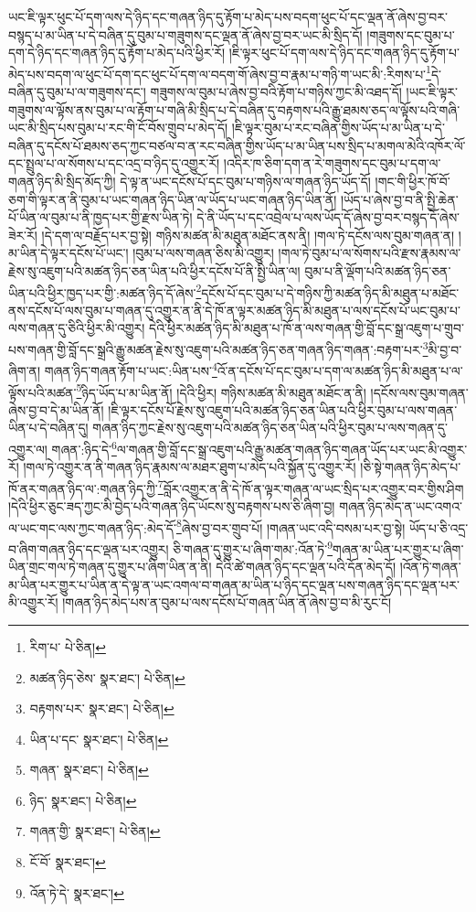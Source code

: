 ཡང་ཇི་ལྟར་ཕུང་པོ་དག་ལས་དེ་ཉིད་དང་གཞན་ཉིད་དུ་རྟོག་པ་མེད་པས་བདག་ཕུང་པོ་དང་ལྡན་ནོ་ཞེས་བྱ་བར་བསྙད་པ་མ་ཡིན་པ་དེ་བཞིན་དུ་བུམ་པ་གཟུགས་དང་ལྡན་ནོ་ཞེས་བྱ་བར་ཡང་མི་སྲིད་དོ། །གཟུགས་དང་བུམ་པ་དག་དེ་ཉིད་དང་གཞན་ཉིད་དུ་རྟོག་པ་མེད་པའི་ཕྱིར་རོ། །ཇི་ལྟར་ཕུང་པོ་དག་ལས་དེ་ཉིད་དང་གཞན་ཉིད་དུ་རྟོག་པ་མེད་པས་བདག་ལ་ཕུང་པོ་དག་དང་ཕུང་པོ་དག་ལ་བདག་གོ་ཞེས་བྱ་བ་རྣམ་པ་གཉི་ག་ཡང་མི་:རིགས་པ་\footnote{རིག་པ་  པེ་ཅིན། }དེ་བཞིན་དུ་བུམ་པ་ལ་གཟུགས་དང་། གཟུགས་ལ་བུམ་པ་ཞེས་བྱ་བའི་རྟོག་པ་གཉིས་ཀྱང་མི་འཐད་དོ། །ཡང་ཇི་ལྟར་གཟུགས་ལ་ལྟོས་ནས་བུམ་པ་ལ་རྟོག་པ་གཞི་མི་སྲིད་པ་དེ་བཞིན་དུ་བརྟགས་པའི་རྒྱུ་ཐམས་ཅད་ལ་ལྟོས་པའི་གཞི་ཡང་མི་སྲིད་པས་བུམ་པ་རང་གི་ངོ་བོས་གྲུབ་པ་མེད་དོ། །ཇི་ལྟར་བུམ་པ་རང་བཞིན་གྱིས་ཡོད་པ་མ་ཡིན་པ་དེ་བཞིན་དུ་དངོས་པོ་ཐམས་ཅད་ཀྱང་བཙལ་བ་ན་རང་བཞིན་གྱིས་ཡོད་པ་མ་ཡིན་པས་སྲིད་པ་མགལ་མེའི་འཁོར་ལོ་དང་སྤྲུལ་པ་ལ་སོགས་པ་དང་འདྲ་བ་ཉིད་དུ་འགྱུར་རོ། །འདིར་ཁ་ཅིག་དག་ན་རེ་གཟུགས་དང་བུམ་པ་དག་ལ་གཞན་ཉིད་མི་སྲིད་མོད་ཀྱི། དེ་ལྟ་ན་ཡང་དངོས་པོ་དང་བུམ་པ་གཉིས་ལ་གཞན་ཉིད་ཡོད་དོ། །གང་གི་ཕྱིར་ཁོ་བོ་ཅག་གི་ལྟར་ན་ནི་བུམ་པ་ཡང་གཞན་ཉིད་ཡིན་ལ་ཡོད་པ་ཡང་གཞན་ཉིད་ཡིན་ནོ། །ཡོད་པ་ཞེས་བྱ་བ་ནི་སྤྱི་ཆེན་པོ་ཡིན་ལ་བུམ་པ་ནི་ཁྱད་པར་གྱི་རྫས་ཡིན་ཏེ། དེ་ནི་ཡོད་པ་དང་འབྲེལ་པ་ལས་ཡོད་དོ་ཞེས་བྱ་བར་བསྙད་དོ་ཞེས་ཟེར་རོ། །དེ་དག་ལ་བརྗོད་པར་བྱ་སྟེ། གཉིས་མཚན་མི་མཐུན་མཐོང་ནས་ནི། །གལ་ཏེ་དངོས་ལས་བུམ་གཞན་ན། །མ་ཡིན་དེ་ལྟར་དངོས་པོ་ཡང་། །བུམ་པ་ལས་གཞན་ཅིས་མི་འགྱུར། །གལ་ཏེ་བུམ་པ་ལ་སོགས་པའི་རྫས་རྣམས་ལ་རྗེས་སུ་འཇུག་པའི་མཚན་ཉིད་ཅན་ཡིན་པའི་ཕྱིར་དངོས་པོ་ནི་སྤྱི་ཡིན་ལ། བུམ་པ་ནི་ལྡོག་པའི་མཚན་ཉིད་ཅན་ཡིན་པའི་ཕྱིར་ཁྱད་པར་གྱི་:མཚན་ཉིད་དོ་ཞེས་\footnote{མཚན་ཉིད་ཅེས་  སྣར་ཐང་།  པེ་ཅིན། }དངོས་པོ་དང་བུམ་པ་དེ་གཉིས་ཀྱི་མཚན་ཉིད་མི་མཐུན་པ་མཐོང་ནས་དངོས་པོ་ལས་བུམ་པ་གཞན་དུ་འགྱུར་ན་ནི་དེ་ཁོ་ན་ལྟར་མཚན་ཉིད་མི་མཐུན་པ་ལས་དངོས་པོ་ཡང་བུམ་པ་ལས་གཞན་དུ་ཅིའི་ཕྱིར་མི་འགྱུར། དེའི་ཕྱིར་མཚན་ཉིད་མི་མཐུན་པ་ཁོ་ན་ལས་གཞན་གྱི་བློ་དང་སྒྲ་འཇུག་པ་གྲུབ་པས་གཞན་གྱི་བློ་དང་སྒྲའི་རྒྱུ་མཚན་རྗེས་སུ་འཇུག་པའི་མཚན་ཉིད་ཅན་གཞན་ཉིད་གཞན་:བརྟག་པར་\footnote{བརྟགས་པར་  སྣར་ཐང་།  པེ་ཅིན། }མི་བྱ་བ་ཞིག་ན། གཞན་ཉིད་གཞན་རྟོག་པ་ཡང་:ཡིན་པས་\footnote{ཡིན་པ་དང་  སྣར་ཐང་།  པེ་ཅིན། }འོ་ན་དངོས་པོ་དང་བུམ་པ་དག་ལ་མཚན་ཉིད་མི་མཐུན་པ་ལ་ལྟོས་པའི་མཚན་\footnote{གཞན་  སྣར་ཐང་།  པེ་ཅིན། }ཉིད་ཡོད་པ་མ་ཡིན་ནོ། །དེའི་ཕྱིར། གཉིས་མཚན་མི་མཐུན་མཐོང་ན་ནི། །དངོས་ལས་བུམ་གཞན་ཞེས་བྱ་བ་དེ་མ་ཡིན་ནོ། །ཇི་ལྟར་དངོས་པོ་རྗེས་སུ་འཇུག་པའི་མཚན་ཉིད་ཅན་ཡིན་པའི་ཕྱིར་བུམ་པ་ལས་གཞན་ཡིན་པ་དེ་བཞིན་དུ། གཞན་ཉིད་ཀྱང་རྗེས་སུ་འཇུག་པའི་མཚན་ཉིད་ཅན་ཡིན་པའི་ཕྱིར་བུམ་པ་ལས་གཞན་དུ་འགྱུར་ལ། གཞན་:ཉིད་དེ་\footnote{ཉིད་  སྣར་ཐང་།  པེ་ཅིན། }ལ་གཞན་གྱི་བློ་དང་སྒྲ་འཇུག་པའི་རྒྱུ་མཚན་གཞན་ཉིད་གཞན་ཡོད་པར་ཡང་མི་འགྱུར་རོ། །གལ་ཏེ་འགྱུར་ན་ནི་གཞན་ཉིད་རྣམས་ལ་མཐར་ཐུག་པ་མེད་པའི་སྐྱོན་དུ་འགྱུར་རོ། །ཅི་སྟེ་གཞན་ཉིད་མེད་པ་ཁོ་ནར་གཞན་ཉིད་ལ་:གཞན་ཉིད་ཀྱི་\footnote{གཞན་གྱི་  སྣར་ཐང་།  པེ་ཅིན། }བློར་འགྱུར་ན་ནི་དེ་ཁོ་ན་ལྟར་གཞན་ལ་ཡང་སྲིད་པར་འགྱུར་བར་གྱིས་ཤིག །དེའི་ཕྱིར་ཅུང་ཟད་ཀྱང་མི་བྱེད་པའི་གཞན་ཉིད་ཡོངས་སུ་བརྟགས་པས་ཅི་ཞིག་བྱ། གཞན་ཉིད་མེད་ན་ཡང་འགའ་ལ་ཡང་གང་ལས་ཀྱང་གཞན་ཉིད་:མེད་དོ་\footnote{ངོ་བོ་  སྣར་ཐང་། }ཞེས་བྱ་བར་གྲུབ་པོ། །གཞན་ཡང་འདི་བསམ་པར་བྱ་སྟེ། ཡོད་པ་ཅི་འདྲ་བ་ཞིག་གཞན་ཉིད་དང་ལྡན་པར་འགྱུར། ཅི་གཞན་དུ་གྱུར་པ་ཞིག་གམ་:འོན་ཏེ་\footnote{འོན་ཏེ་དེ་  སྣར་ཐང་། }གཞན་མ་ཡིན་པར་གྱུར་པ་ཞིག་ཡིན་གྲང་གལ་ཏེ་གཞན་དུ་གྱུར་པ་ཞིག་ཡིན་ན་ནི། དེའི་ཚེ་གཞན་ཉིད་དང་ལྡན་པའི་དོན་མེད་དོ། །འོན་ཏེ་གཞན་མ་ཡིན་པར་གྱུར་པ་ཡིན་ན་དེ་ལྟ་ན་ཡང་འགལ་བ་གཞན་མ་ཡིན་པ་ཉིད་དང་ལྡན་པས་གཞན་ཉིད་དང་ལྡན་པར་མི་འགྱུར་རོ། །གཞན་ཉིད་མེད་པས་ན་བུམ་པ་ལས་དངོས་པོ་གཞན་ཡིན་ནོ་ཞེས་བྱ་བ་མི་རུང་ངོ། 